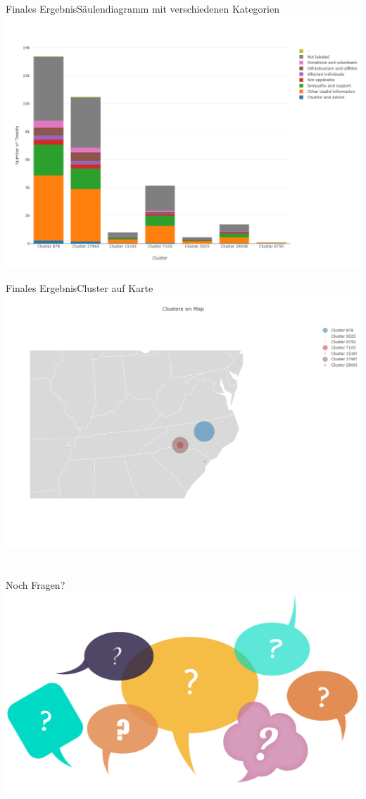 \documentclass[12pt, xcolor={usenames,dvipsnames,svgnames,x11names,table}]{beamer}
\begin{document}
	\begin{frame}{Finales Ergebnis}{Säulendiagramm mit verschiedenen Kategorien}
		\center\includegraphics[width=.9\textwidth, clip=true, trim=0mm 0mm 0mm 30mm]{twitter_bar_info_class}
	\end{frame}
	
	\begin{frame}{Finales Ergebnis}{Cluster auf Karte}
		\center\includegraphics[width=.9\textwidth, clip=true, trim=0mm 0mm 0mm 0mm]{twitter_map}
	\end{frame}
	
	
	
	\section{}
	\begin{frame}{Noch Fragen?}
		\includegraphics[width=\textwidth]{fragen}
	\end{frame}
\end{document}

